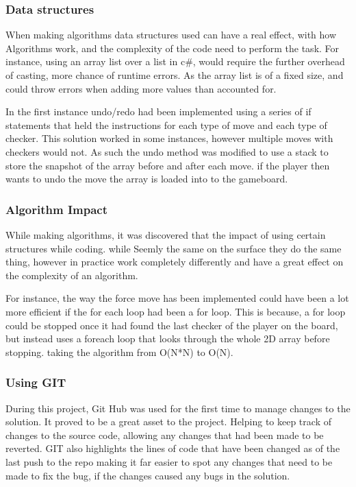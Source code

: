 \documentclass[10pt, a4paper]{article}
\begin{document}
	\subsubsection{Data structures}
When making algorithms data structures used can have a real effect, with how Algorithms work, and the complexity of the code need to perform the task. For instance, using an array list over a list in c\#, would require the further overhead of casting, more chance of runtime errors. As the array list is of a fixed size, and could throw errors when adding more values than accounted for. 

In the first instance undo/redo had been implemented using a series of if statements that held the instructions for each type of move and each type of checker. This solution worked in some instances, however multiple moves with checkers would not. As such the undo method was modified to use a stack to store the snapshot of the array before and after each move. if the player then wants to undo the move the array is loaded into to the gameboard.

	\subsubsection{Algorithm Impact}
	While making algorithms, it was discovered that the impact of using certain structures while coding. while Seemly the same on the surface they do the same thing, however in practice work completely differently and have a great effect on the complexity of an algorithm.

For instance, the way the force move has been implemented could have been a lot more efficient if the for each loop had been a for loop. This is because, a for loop could be stopped once it had found the last checker of the player on the board, but instead uses a foreach loop that looks through the whole 2D array before stopping. taking the algorithm from O(N*N) to O(N).\cite{Bell}
	\subsubsection{Using GIT}
During this project, Git Hub was used for the first time to manage changes to the solution. It proved to be a great asset to the project. Helping to keep track of changes to the source code, allowing any changes that had been made to be reverted. GIT also highlights the lines of code that have been changed as of the last push to the repo making it far easier to spot any changes that need to be made to fix the bug, if the changes caused any bugs in the solution.
\end{document}
